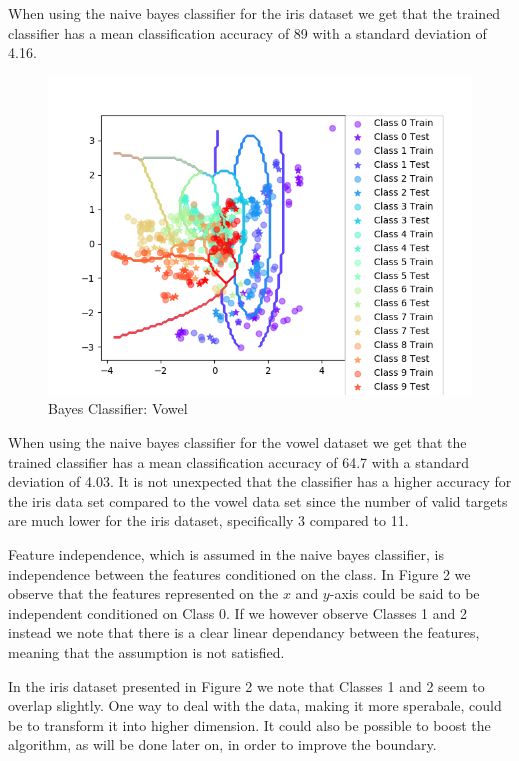 \documentclass{article}
\begin{document}
When using the naive bayes classifier for the iris dataset we get that the trained classifier has a mean classification accuracy of 89 with a standard deviation of 4.16.

\begin{figure}
    \centering
    \includegraphics[scale = 0.90]{BayesVowel.png}
    \caption{Bayes Classifier: Vowel}
\end{figure}

When using the naive bayes classifier for the vowel dataset we get that the trained classifier has a mean classification accuracy of 64.7 with a standard deviation of 4.03. It is not unexpected that the classifier has a higher accuracy for the iris data set compared to the vowel data set since the number of valid targets are much lower for the iris dataset, specifically 3 compared to 11.

Feature independence, which is assumed in the naive bayes classifier, is independence between the features conditioned on the class. In Figure 2 we observe that the features represented on the $x$ and $y$-axis could be said to be independent conditioned on Class 0. If we however observe Classes 1 and 2 instead we note that there is a clear linear dependancy between the features, meaning that the assumption is not satisfied. 

In the iris dataset presented in Figure 2 we note that Classes 1 and 2 seem to overlap slightly. One way to deal with the data, making it more sperabale, could be to transform it into higher dimension. It could also be possible to boost the algorithm, as will be done later on, in order to improve the boundary. 
\end{document}
